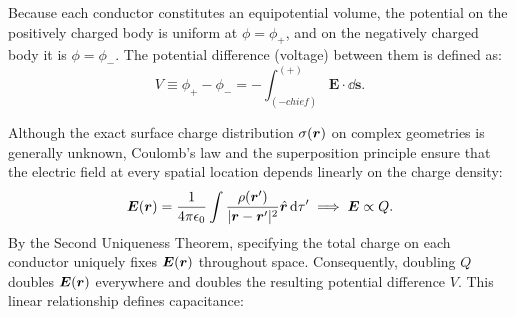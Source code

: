 \begin{center}
\end{center}

Because each conductor constitutes an equipotential volume, the potential on the positively charged body is uniform at \(\phi = \phi_+\), and on the negatively charged body it is \(\phi = \phi_-\). The potential difference (voltage) between them is defined as:
\begin{equation}
    V \equiv \phi_+ - \phi_- = -\int_{(- chief)}^{(+)} \bm{E} \cdot \dd\bm{s}.
\end{equation}

Although the exact surface charge distribution \(\sigma(\bm{r})\) on complex geometries is generally unknown, Coulomb's law and the superposition principle ensure that the electric field at every spatial location depends linearly on the charge density:
\begin{equation}
    \bm{E}(\bm{r}) = \frac{1}{4\pi\epsilon_0} \int \frac{\rho(\bm{r}')}{|\bm{r} - \bm{r}'|^2} \hat{\bm{\bm{r}}}\, \dd\tau' \implies \bm{E} \propto Q.
\end{equation}
By the Second Uniqueness Theorem, specifying the total charge on each conductor uniquely fixes \(\bm{E}(\bm{r})\) throughout space. Consequently, doubling \(Q\) doubles \(\bm{E}(\bm{r})\) everywhere and doubles the resulting potential difference \(V\). This linear relationship defines capacitance:

